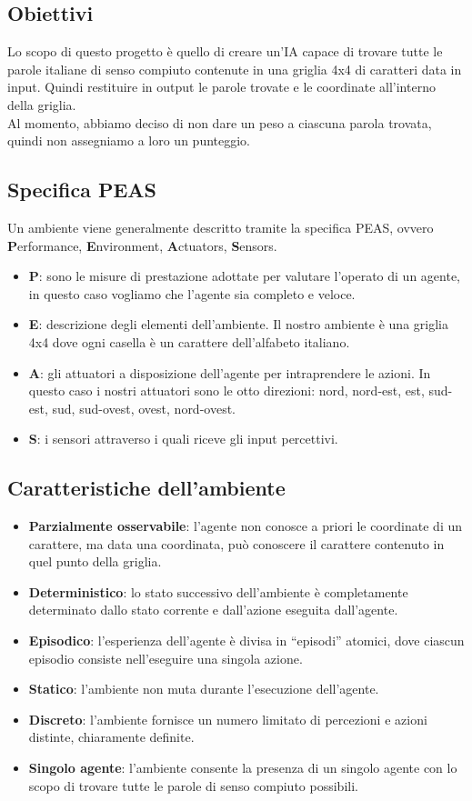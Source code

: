 \documentclass[10pt,a4paper]{article}
\begin{document}
	\subsection{Obiettivi}
	Lo scopo di questo progetto è quello di creare un'IA capace di trovare tutte le parole italiane di senso compiuto contenute in una griglia 4x4 di caratteri data in input.
	Quindi restituire in output le parole trovate e le coordinate all'interno della griglia.\\
	Al momento, abbiamo deciso di non dare un peso a ciascuna parola trovata, quindi non assegniamo a loro un punteggio.
	\subsection{Specifica PEAS}
	Un ambiente viene generalmente descritto tramite la specifica PEAS, ovvero \textbf{P}erformance, \textbf{E}nvironment, \textbf{A}ctuators, \textbf{S}ensors.
	\begin{itemize}
		\item \textbf{P}: sono le misure di prestazione adottate per valutare l’operato di un agente, in questo caso vogliamo che l'agente sia completo e veloce.
		\item \textbf{E}: descrizione degli elementi dell'ambiente. Il nostro ambiente è una griglia 4x4 dove ogni casella è un carattere dell'alfabeto italiano.
		\item \textbf{A}: gli attuatori a disposizione dell'agente per intraprendere le azioni. In questo caso i nostri attuatori sono le otto direzioni: nord, nord-est, est, sud-est, sud, sud-ovest, ovest, nord-ovest.
		\item \textbf{S}: i sensori attraverso i quali riceve gli input percettivi.
	\end{itemize}
	\subsection{Caratteristiche dell'ambiente}
	\begin{itemize}
		\item \textbf{Parzialmente osservabile}: l'agente non conosce a priori le coordinate di un carattere, ma data una coordinata, può conoscere il carattere contenuto in quel punto della griglia.
		\item \textbf{Deterministico}: lo stato successivo dell’ambiente è completamente determinato dallo stato corrente e dall’azione eseguita dall’agente.
		\item \textbf{Episodico}: l’esperienza dell’agente è divisa in “episodi” atomici, dove ciascun episodio consiste nell’eseguire una singola azione.
		\item \textbf{Statico}: l'ambiente non muta durante l'esecuzione dell'agente.
		\item \textbf{Discreto}: l’ambiente fornisce un numero limitato di percezioni e azioni distinte, chiaramente definite.
		\item \textbf{Singolo agente}: l'ambiente consente la presenza di  un singolo agente con lo scopo di trovare tutte le parole di senso compiuto possibili.
	\end{itemize}
\end{document}
